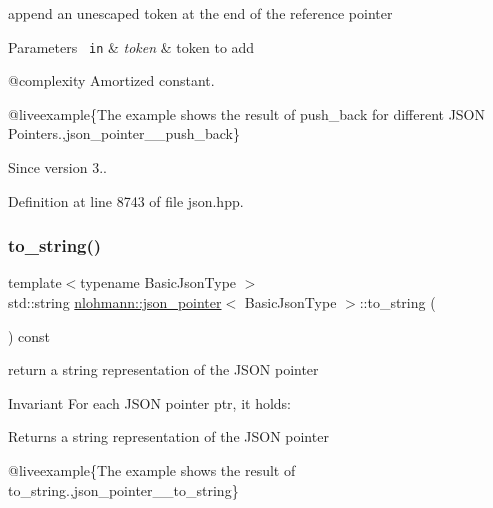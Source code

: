append an unescaped token at the end of the reference pointer 


\begin{DoxyParams}[1]{Parameters}
\mbox{\texttt{ in}}  & {\em token} & token to add\\
\hline
\end{DoxyParams}
@complexity Amortized constant.

@liveexample\{The example shows the result of {\ttfamily push\+\_\+back} for different J\+S\+ON Pointers.,json\+\_\+pointer\+\_\+\+\_\+push\+\_\+back\}

\begin{DoxySince}{Since}
version 3.. 
\end{DoxySince}


Definition at line 8743 of file json.\+hpp.

\mbox{\label{classnlohmann_1_1json__pointer_a3d4b15d32d096e3776c5d2c773b524f5}} 
\subsubsection{\texorpdfstring{to\_string()}{to\_string()}}
{\footnotesize\ttfamily template$<$typename Basic\+Json\+Type $>$ \\
std\+::string \mbox{\hyperlink{classnlohmann_1_1json__pointer}{nlohmann\+::json\+\_\+pointer}}$<$ Basic\+Json\+Type $>$\+::to\+\_\+string (\begin{DoxyParamCaption}{ }\end{DoxyParamCaption}) const\hspace{0.3cm}{\ttfamily [inline]}}



return a string representation of the J\+S\+ON pointer 

\begin{DoxyInvariant}{Invariant}
For each J\+S\+ON pointer {\ttfamily ptr}, it holds\+: 
\begin{DoxyCode}{0}
\end{DoxyCode}

\end{DoxyInvariant}
\begin{DoxyReturn}{Returns}
a string representation of the J\+S\+ON pointer
\end{DoxyReturn}
@liveexample\{The example shows the result of {\ttfamily to\+\_\+string}.,json\+\_\+pointer\+\_\+\+\_\+to\+\_\+string\}

